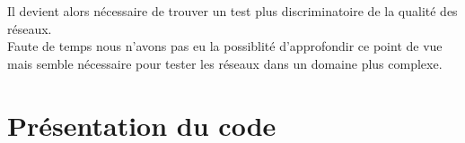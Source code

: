 \documentclass[a4paper,oneside]{report}
\begin{document}
                Il devient alors nécessaire de trouver un test plus discriminatoire de la qualité des réseaux.\\

                Faute de temps nous n'avons pas eu la possiblité d'approfondir ce point de vue mais semble nécessaire pour tester les réseaux dans un domaine plus complexe.

        \chapter{Présentation du code}
\end{document}
